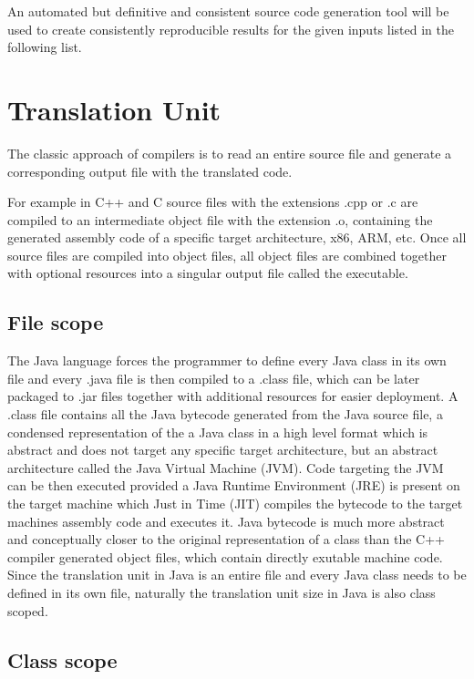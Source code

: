 \documentclass{VUMIFPSbakalaurinis}
\begin{document}
An automated but definitive and consistent source code generation tool will be used to create consistently reproducible results for the given inputs listed in the following list.

\section{Translation Unit}
The classic approach of compilers is to read an entire source file and generate a corresponding output file with the translated code.

For example in C++ and C source files with the extensions .cpp or .c are compiled to an intermediate object file with the extension .o, containing the generated assembly code of a specific target architecture, x86, ARM, etc.
Once all source files are compiled into object files, all object files are combined together with optional resources into a singular output file called the executable.


\subsection{File scope}
The Java language forces the programmer to define every Java class in its own file and every .java file is then compiled to a .class file, which can be later packaged to .jar files together with additional resources for easier deployment.
A .class file contains all the Java bytecode generated from the Java source file, a condensed representation of the a Java class in a high level format which is abstract and does not target any specific target architecture, but an abstract architecture called the Java Virtual Machine (JVM).
Code targeting the JVM can be then executed provided a Java Runtime Environment (JRE) is present on the target machine which Just in Time (JIT) compiles the bytecode to the target machines assembly code and executes it.
Java bytecode is much more abstract and conceptually closer to the original representation of a class than the C++ compiler generated object files, which contain directly exutable machine code.
Since the translation unit in Java is an entire file and every Java class needs to be defined in its own file, naturally the translation unit size in Java is also class scoped.

\subsection{Class scope}
\end{document}
